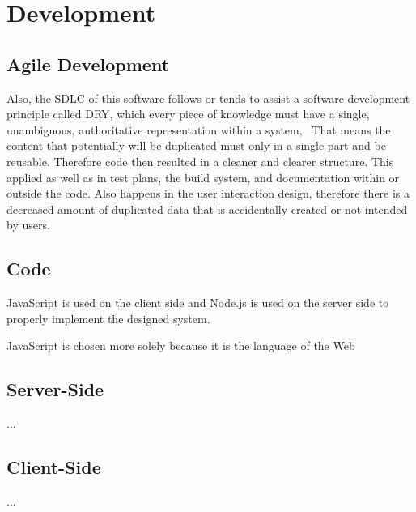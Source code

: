 \section{Development}
\label{sec:development}

\subsection{Agile Development}


Also, the \ac{SDLC} of this software follows or tends to assist a software development principle called \ac{DRY},
which every piece of knowledge must have a single, unambiguous, authoritative representation within a system,~\autocite{Hunt1999Pragmatic}
That means the content that potentially will be duplicated must only in a single part and be reusable.
Therefore code then resulted in a cleaner and clearer structure.
This applied as well as in test plans, the build system, and documentation within or outside the code.
Also happens in the user interaction design, therefore there is a decreased amount of duplicated data that is accidentally created or not intended by users.

\subsection{Code}

JavaScript is used on the client side and Node.js is used on the server side to properly implement the designed system.

JavaScript is chosen more solely because it is the language of the Web



\subsection{Server-Side}

...


\subsection{Client-Side}

...

